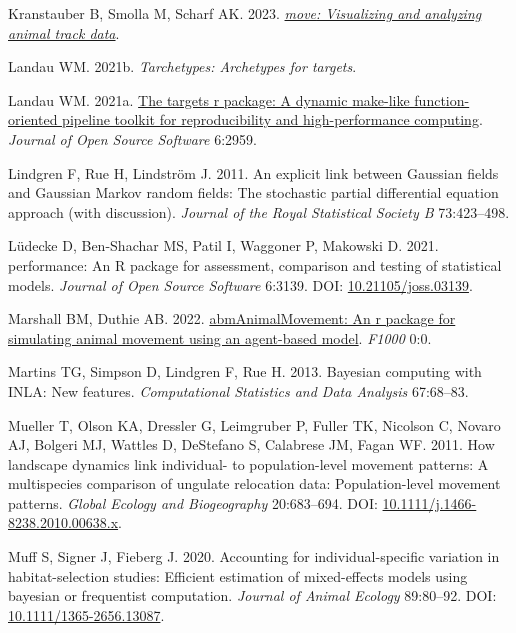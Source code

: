 \documentclass[10pt,a4paper]{article}
\newlength{\cslhangindent}
\newlength{\cslentryspacingunit} %
\newenvironment{CSLReferences}[2] %
 {%
  \setlength{\parindent}{0pt}
  \ifodd #1
  \let\oldpar\par
  \def\par{\hangindent=\cslhangindent\oldpar}
  \fi
  \setlength{\parskip}{#2\cslentryspacingunit}
 }%
 {}
\begin{document}
\begin{CSLReferences}{1}{0}
Kranstauber B, Smolla M, Scharf AK. 2023. \emph{\href{https://CRAN.R-project.org/package=move}{{move}: Visualizing and analyzing animal track data}}.

Landau WM. 2021b. \emph{Tarchetypes: Archetypes for targets}.

Landau WM. 2021a. \href{https://doi.org/10.21105/joss.02959}{The targets r package: A dynamic make-like function-oriented pipeline toolkit for reproducibility and high-performance computing}. \emph{Journal of Open Source Software} 6:2959.

Lindgren F, Rue H, Lindström J. 2011. An explicit link between {Gaussian} fields and {Gaussian} {Markov} random fields: The stochastic partial differential equation approach (with discussion). \emph{Journal of the Royal Statistical Society B} 73:423--498.

Lüdecke D, Ben-Shachar MS, Patil I, Waggoner P, Makowski D. 2021. {performance}: An {R} package for assessment, comparison and testing of statistical models. \emph{Journal of Open Source Software} 6:3139. DOI: \href{https://doi.org/10.21105/joss.03139}{10.21105/joss.03139}.

Marshall BM, Duthie AB. 2022. \href{https://0}{{abmAnimalMovement}: An r package for simulating animal movement using an agent-based model}. \emph{F1000} 0:0.

Martins TG, Simpson D, Lindgren F, Rue H. 2013. Bayesian computing with {INLA}: {N}ew features. \emph{Computational Statistics and Data Analysis} 67:68--83.

Mueller T, Olson KA, Dressler G, Leimgruber P, Fuller TK, Nicolson C, Novaro AJ, Bolgeri MJ, Wattles D, DeStefano S, Calabrese JM, Fagan WF. 2011. How landscape dynamics link individual- to population-level movement patterns: A multispecies comparison of ungulate relocation data: {Population}-level movement patterns. \emph{Global Ecology and Biogeography} 20:683--694. DOI: \href{https://doi.org/10.1111/j.1466-8238.2010.00638.x}{10.1111/j.1466-8238.2010.00638.x}.

Muff S, Signer J, Fieberg J. 2020. Accounting for individual-specific variation in habitat-selection studies: Efficient estimation of mixed-effects models using bayesian or frequentist computation. \emph{Journal of Animal Ecology} 89:80--92. DOI: \href{https://doi.org/10.1111/1365-2656.13087}{10.1111/1365-2656.13087}.


\end{CSLReferences}
\end{document}
